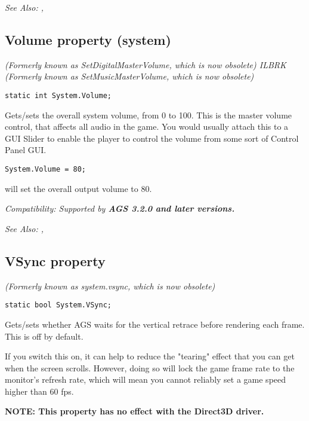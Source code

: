 \it{See Also:} ,


\subsection{Volume property (system)}\label{System.Volume}%

\it{(Formerly known as SetDigitalMasterVolume, which is now obsolete)} ILBRK
\it{(Formerly known as SetMusicMasterVolume, which is now obsolete)}

\begin{verbatim}
static int System.Volume;
\end{verbatim}
Gets/sets the overall system volume, from 0 to 100. This is the master volume control, that
affects all audio in the game. You would usually attach this to a GUI Slider to enable the
player to control the volume from some sort of Control Panel GUI.

\begin{verbatim}
System.Volume = 80;
\end{verbatim}
will set the overall output volume to 80.

\it{Compatibility:} Supported by \bf{AGS 3.2.0} and later versions.

\it{See Also:} ,


\subsection{VSync property}\label{System.VSync}%

\it{(Formerly known as system.vsync, which is now obsolete)}

\begin{verbatim}
static bool System.VSync;
\end{verbatim}
Gets/sets whether AGS waits for the vertical retrace before rendering each frame.
This is off by default.

If you switch this on, it can help to reduce the "tearing" effect that you can
get when the screen scrolls. However, doing so will lock the game frame rate to
the monitor's refresh rate, which will mean you cannot reliably set a game speed higher
than 60 fps.

\bf{NOTE:} This property has no effect with the Direct3D driver.

